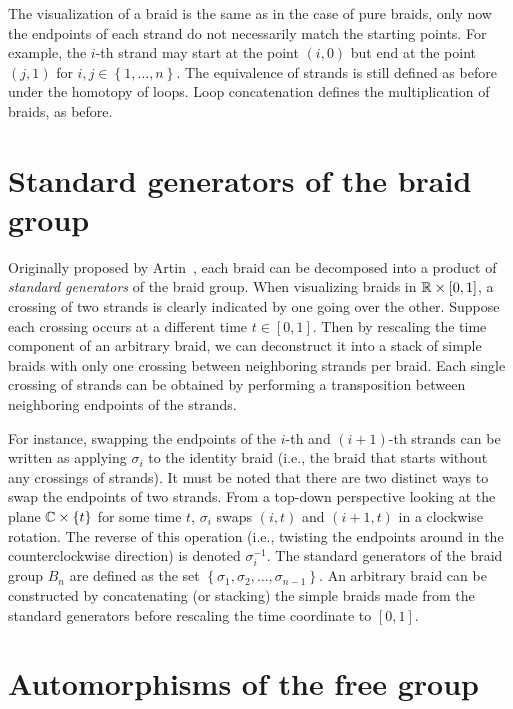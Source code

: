 The visualization of a braid is the same as in the case of pure braids, only now the endpoints of each strand do not necessarily match the starting points. For example, the $i$-th strand may start at the point $(i,0)$ but end at the point $(j,1)$ for $i,j\in\left\{ 1,\dots,n \right\}$. The equivalence of strands is still defined as before under the homotopy of loops. Loop concatenation defines the multiplication of braids, as before.

\section{Standard generators of the braid group}\label{sec:std_gens}
Originally proposed by Artin~\cite{Artin1947}, each braid can be decomposed into a product of \textit{standard generators} of the braid group. When visualizing braids in $\mathbb{R}\times[0,1]$, a crossing of two strands is clearly indicated by one going over the other. Suppose each crossing occurs at a different time $t\in[0,1]$. Then by rescaling the time component of an arbitrary braid, we can deconstruct it into a stack of simple braids with only one crossing between neighboring strands per braid. Each single crossing of strands can be obtained by performing a transposition between neighboring endpoints of the strands.


For instance, swapping the endpoints of the $i$-th and $(i+1)$-th strands can be written as applying $\sigma_i$ to the identity braid (i.e., the braid that starts without any crossings of strands). It must be noted that there are two distinct ways to swap the endpoints of two strands. From a top-down perspective looking at the plane $\mathbb{C}\times\left\{ t \right\}$ for some time $t$, $\sigma_i$ swaps $(i,t)$ and $(i+1,t)$ in a clockwise rotation. The reverse of this operation (i.e., twisting the endpoints around in the counterclockwise direction) is denoted $\sigma_i^{-1}$. The standard generators of the braid group $B_n$ are defined as the set $\left\{ \sigma_1,\sigma_2,\dots,\sigma_{n-1} \right\}$. An arbitrary braid can be constructed by concatenating (or stacking) the simple braids made from the standard generators before rescaling the time coordinate to $[0,1]$.

\section{Automorphisms of the free group}

